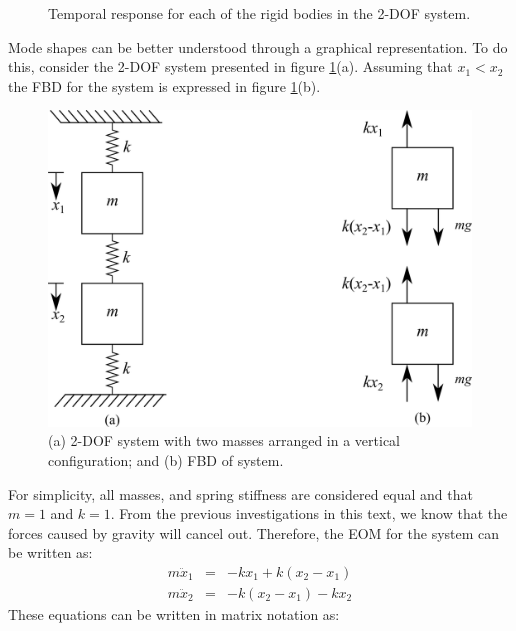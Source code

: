 \documentclass[12pt,letter]{article}
\begin{document}
\begin{example}
\begin{figure}[H]
		\caption{Temporal response for each of the rigid bodies in the 2-DOF system.}
	\end{figure}
	\end{example}
	
	
	
	
	
	\begin{example}
	Mode shapes can be better understood through a graphical representation. To do this, consider the 2-DOF system presented in figure \ref{fig:2-DOF-spring_mass_vertical}(a). Assuming that $x_1<x_2$ the FBD for the system is expressed in figure \ref{fig:2-DOF-spring_mass_vertical}(b).
	
	\begin{figure}[H]
		\centering
		\includegraphics[]{../figures/2-DOF-spring_mass_vertical_with_FBD.png}
		\caption{(a) 2-DOF system with two masses arranged in a vertical configuration; and (b) FBD of system.}
		\label{fig:2-DOF-spring_mass_vertical}
	\end{figure}
	\noindent For simplicity, all masses, and spring stiffness are considered equal and that $m=1$ and $k=1$. From the previous investigations in this text, we know that the forces caused by gravity will cancel out. Therefore, the EOM for the system can be written as:
	\begin{eqnarray}
	m\ddot{x}_1 &= & -kx_1 + k(x_2-x_1) \\
	m\ddot{x}_2&= & -k(x_2-x_1) -kx_2 \nonumber
	\end{eqnarray}
	These equations can be written in matrix notation as:
	\begin{eqnarray}

\end{eqnarray}
\end{example}
\end{document}
